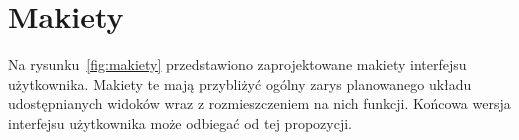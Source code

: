 

\section{Makiety}
Na rysunku~\ref{fig:makiety} przedstawiono zaprojektowane makiety interfejsu użytkownika. Makiety te mają przybliżyć ogólny zarys planowanego układu udostępnianych widoków wraz z rozmieszczeniem na nich funkcji. Końcowa wersja interfejsu użytkownika może odbiegać od tej propozycji.
